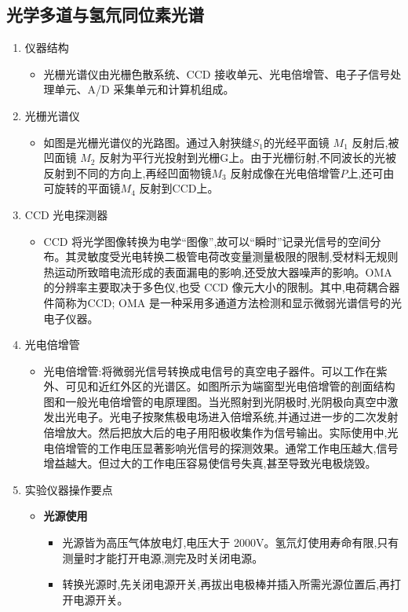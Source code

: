 \documentclass[12pt, a4paper]{article}
\begin{document}
\subsection{光学多道与氢氘同位素光谱}
\begin{enumerate}
    \item 仪器结构
    \begin{itemize}
    \item 光栅光谱仪由光栅色散系统、CCD 接收单元、光电倍增管、电子子信号处理单元、A/D 采集单元和计算机组成。
    \end{itemize}
    
    \item 光栅光谱仪
    \begin{itemize}
    \item 如图是光栅光谱仪的光路图。通过入射狭缝$S_1$的光经平面镜 $M_1$ 反射后,被凹面镜 $M_2$ 反射为平行光投射到光栅G上。由于光栅衍射,不同波长的光被反射到不同的方向上,再经凹面物镜$M_3$ 反射成像在光电倍增管$P$上,还可由可旋转的平面镜$M_4$ 反射到CCD上。
    \end{itemize}
    
    \item CCD 光电探测器
    \begin{itemize}
    \item CCD 将光学图像转换为电学“图像”,故可以“瞬时”记录光信号的空间分布。其灵敏度受光电转换二极管电荷改变量测量极限的限制,受材料无规则热运动所致暗电流形成的表面漏电的影响,还受放大器噪声的影响。OMA 的分辨率主要取决于多色仪,也受 CCD 像元大小的限制。其中,电荷耦合器件简称为CCD; OMA 是一种采用多通道方法检测和显示微弱光谱信号的光电子仪器。
    \end{itemize}

    \item 光电倍增管
    \begin{itemize}
    \item 光电倍增管:将微弱光信号转换成电信号的真空电子器件。可以工作在紫外、可见和近红外区的光谱区。如图所示为端窗型光电倍增管的剖面结构图和一般光电倍增管的电原理图。当光照射到光阴极时,光阴极向真空中激发出光电子。光电子按聚焦极电场进入倍增系统,并通过进一步的二次发射倍增放大。然后把放大后的电子用阳极收集作为信号输出。实际使用中,光电倍增管的工作电压显著影响光信号的探测效果。通常工作电压越大,信号增益越大。但过大的工作电压容易使信号失真,甚至导致光电极烧毁。
    \end{itemize}
    
     \item 实验仪器操作要点
    \begin{itemize}
        \item \textbf{光源使用}
            \begin{itemize}
             \item 光源皆为高压气体放电灯,电压大于 2000V。氢氘灯使用寿命有限,只有测量时才能打开电源,测完及时关闭电源。
             \item 转换光源时,先关闭电源开关,再拔出电极棒并插入所需光源位置后,再打开电源开关。
            \end{itemize}


\end{itemize}
\end{enumerate}
\end{document}

